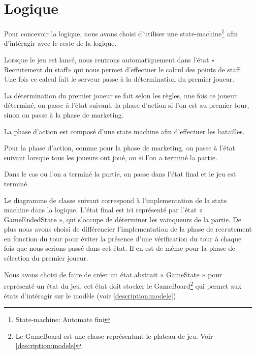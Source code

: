 \chapter{Logique} \label{chapter:logique}

Pour concevoir la logique, nous avons choisi d'utiliser une
state-machine\footnote{State-machine: Automate fini} afin d'intéragir avec le
reste de la logique.

Lorsque le jeu est lancé, nous rentrons automatiquement dans l'état «
Recrutement du staff» qui nous permet d'effectuer le calcul des points de staff.
Une fois ce calcul fait le serveur passe à la détermination du premier joueur.

La détermination du premier joueur se fait selon les règles, une fois ce joueur
déterminé, on passe à l'état suivant, la phase d'action si l'on est au premier
tour, sinon on passe à la phase de marketing.

La phase d'action est composé d'une state machine afin d'effectuer les
batailles.

Pour la phase d'action, comme pour la phase de marketing, on passe à l'état
suivant lorsque tous les joueurs ont joué, ou si l'on a terminé la partie.

Dans le cas ou l'on a terminé la partie, on passe dans l'état final et le jeu
est terminé.


Le diagramme de classe suivant correspond à l'implementation de la state machine
dans la logique.
L'état final est ici représenté par l'état « GameEndedState », qui s'occupe de
déterminer les vainqueurs de la partie.
De plus nous avons choisi de différencier l'implementation de la phase de
recrutement en fonction du tour pour éviter la présence d'une vérification du
tour à chaque fois que nous serions passé dans cet état.
Il en est de même pour la phase de sélection du premier joueur.

Nous avons choisi de faire de créer un état abstrait « GameState » pour
représenté un état du jeu, cet état doit stocker le GameBoard\footnote{Le GameBoard
  est une classe représentant le plateau de jeu. Voir \ref{description:modele}}
qui permet aux états d'intéragir sur le modèle (voir \ref{description:modele})


